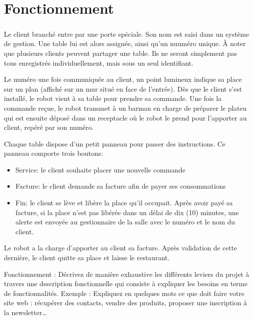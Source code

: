 \chapter{Fonctionnement}
\paragraph{}
Le client branché entre par une porte spéciale. Son 
nom est saisi dans un système de gestion. Une table 
lui est alors assignée, ainsi qu'un nuuméro unique.
À noter que plusieurs clients peuvent partager une 
table. Ils ne seront simplement pas tous enregistrés 
individuellement, mais sous un seul identifiant. \par 
Le numéro une fois communiquée au client, un point 
lumineux indique sa place sur un plan (affiché sur un 
mur situé en face de l'entrée). Dès que le client 
s'est installé, le robot vient à sa table pour prendre
sa commande. Une fois la commande reçue, le robot 
transmet à un barman en charge de préparer le plateu
qui est ensuite déposé dans un receptacle où le robot 
le prend pour l'apporter au client, repéré par son 
numéro. \par 
Chaque table dispose d'un petit panneau pour passer
des instructions. Ce panneau comporte trois boutons:
\par 
\begin{itemize}
    \item Service: le client souhaite placer une nouvelle commande
    \item Facture: le client demande sa facture afin de payer ses consommations
    \item Fin: le client se lève et libère la place qu'il occupait.
    Après avoir payé sa facture, si la place n'est pas 
    libérée dans un délai de dix (10) minutes, une alerte
    est envoyée au gestionnaire de la salle avec le 
    numéro et le nom du client.
\end{itemize}
\par
Le robot a la charge d'apporter au client sa facture. 
Après validation de cette dernière, le client quitte sa
place et laisse le restaurant.

Fonctionnement : Décrivez de manière exhaustive les 
différents leviers du projet à travers une description 
fonctionnelle qui consiste à expliquer les besoins
en terme de fonctionnalités. Exemple : Expliquez en 
quelques mots ce que doit faire votre site web : 
récupérer des contacts, vendre des produits, proposer 
une inscription à la newsletter…